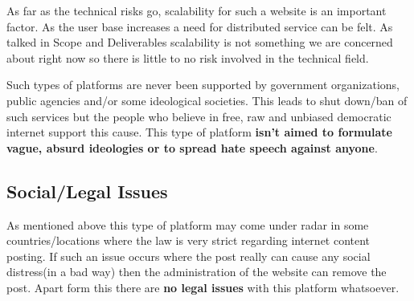 \documentclass[12pt]{article}
\begin{document}
As far as the technical risks go, scalability for such a website is an important factor. As the user base increases a need for distributed service can be felt. As talked in Scope and Deliverables scalability is not something we are concerned about right now so there is little to no risk involved in the technical field.

Such types of platforms are never been supported by government organizations, public agencies and/or some ideological societies. This leads to shut down/ban of such services but the people who believe in free, raw and unbiased democratic internet support this cause. This type of platform \textbf{isn't aimed to formulate vague, absurd ideologies or to spread hate speech against anyone}.

\subsection{Social/Legal Issues}
As mentioned above this type of platform may come under radar in some countries/locations where the law is very strict regarding internet content posting. If such an issue occurs where the post really can cause any social distress(in a bad way) then the administration of the website can remove the post. Apart form this there are \textbf{no legal issues} with this platform whatsoever.
\end{document}
